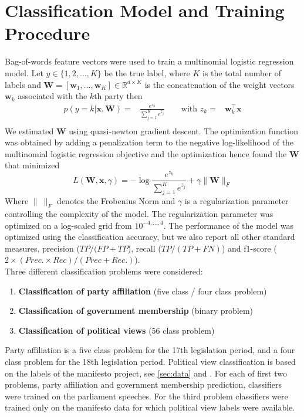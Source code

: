 \documentclass[runningheads,a4paper]{llncs}
\renewcommand{\vec}[1]{\mathbf{#1}}
\newcommand{\R}{\mathds{R}}
\begin{document}
\section{Classification Model and Training Procedure}\label{sec:model}
Bag-of-words feature vectors were used to train a multinomial logistic regression model. Let $y\in\{1,2,\dots,K\}$ be the true  label, where $K$ is the total number of labels and $\vec{W}=[\vec{w}_1,\dots,\vec{w}_K]\in\R^{d\times K}$ is the concatenation of the weight vectors $\vec{w}_k$ associated with the $k$th party then 
\begin{eqnarray}\label{eq:logreg_multiclass}
p(y=k|\vec{x},\vec{W}) = &\frac{e^{z_k}}{\sum_{j=1}^K e^{z_j}} \qquad \textrm{with }  z_k=&\vec{w}_k^{\top}\vec{x} \\\nonumber
\end{eqnarray}
%
We estimated $\vec{W}$ using quasi-newton gradient descent. The optimization function was obtained by adding a penalization term to the negative log-likelihood of the multinomial logistic regression objective and the optimization hence found the $\vec{W}$ that minimized
\begin{equation}\label{eq:objective}
L(\vec{W}, \vec{x}, \gamma) = - \log{\frac{e^{z_k}}{\sum_{j=1}^K e^{z_j}}}+ \gamma \| \vec{W} \|_{F}
\end{equation}
Where $\|~\|_F$ denotes the Frobenius Norm and $\gamma$ is a regularization parameter controlling the complexity of the model. 
The regularization parameter was optimized on a log-scaled grid from $10^{-4,\dots,4}$. The performance of the model was optimized using the classification accuracy, but we also report all other standard measures, precision ($TP / (FP + TP$), recall ($TP / (TP + FN)$) and f1-score ($2\times (Prec. \times Rec) / (Prec + Rec.)$). \\

Three different classification problems were considered: 
\begin{enumerate}
\item {\bf Classification of party affiliation} (five class / four class problem)
\item {\bf Classification of government membership} (binary problem)
\item {\bf Classification of political views} (56 class problem)
\end{enumerate}

Party affiliation is a five class problem for the 17th legislation period, and a four class problem for the 18th legislation period. Political view classification is based on the labels of the manifesto project, see \autoref{sec:data} and \cite{leftright}. 
For each of first two problems, party affiliation and government membership prediction, classifiers were trained on the parliament speeches. For the third problem classifiers were trained only on the manifesto data for which political view labels were available. 
\end{document}
